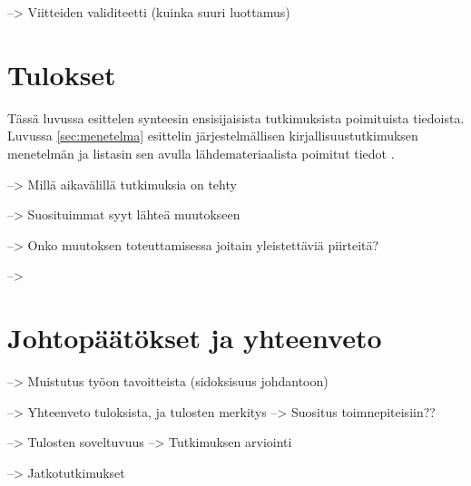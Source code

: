 --> Viitteiden validiteetti (kuinka suuri luottamus)


\section{Tulokset}
\label{sec:tulokset}

Tässä luvussa esittelen synteesin ensisijaisista tutkimuksista poimituista
tiedoista. Luvussa \ref{sec:menetelma} esittelin järjestelmällisen
kirjallisuustutkimuksen menetelmän ja listasin sen avulla lähdemateriaalista
poimitut tiedot \citep{Kitchenham2007}.

--> Millä aikavälillä tutkimuksia on tehty

--> Suosituimmat syyt lähteä muutokseen

--> Onko muutoksen toteuttamisessa joitain yleistettäviä piirteitä?

--> 


\section{Johtopäätökset ja yhteenveto}
\label{sec:johtopaatokset}

--> Muistutus työon tavoitteista (sidoksisuus johdantoon)

--> Yhteenveto tuloksista, ja tulosten merkitys
--> Suositus toimnepiteisiin??

--> Tulosten soveltuvuus
--> Tutkimuksen arviointi

--> Jatkotutkimukset


